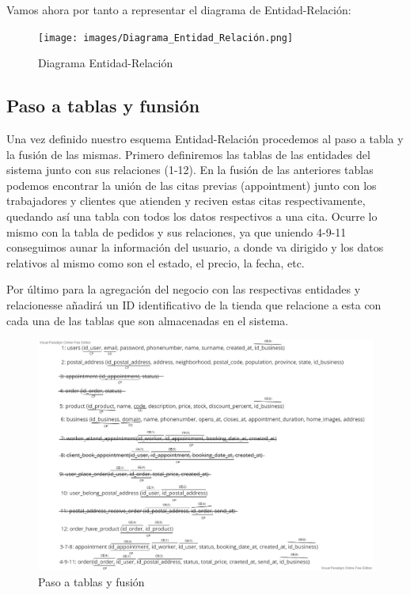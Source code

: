 Vamos ahora por tanto a representar el diagrama de Entidad-Relación: 

\begin{figure}[H]
  \centering
  \texttt{[image: images/Diagrama\_Entidad\_Relación.png]}
  \caption{Diagrama Entidad-Relación}
  \label{}
\end{figure}

\subsection{Paso a tablas y funsión}

Una vez definido nuestro esquema Entidad-Relación procedemos al paso a tabla y la fusión de las mismas. Primero definiremos las tablas de las entidades del sistema junto con sus relaciones (1-12). En la fusión de las anteriores tablas podemos encontrar la unión de las citas previas (appointment) junto con los trabajadores y clientes que atienden y reciven estas citas respectivamente, quedando así una tabla con todos los datos respectivos a una cita. Ocurre lo mismo con la tabla de pedidos y sus relaciones, ya que uniendo 4-9-11 conseguimos aunar la información del usuario, a donde va dirigido y los datos relativos al mismo como son el estado, el precio, la fecha, etc.


Por último para la agregación del negocio con las respectivas entidades y relacionesse añadirá un ID identificativo de la tienda que relacione a esta con cada una de las tablas que son almacenadas en el sistema.

\begin{figure}[H]
  \centering
  \includegraphics[scale=0.3]{images/Paso_a_Tablas_Negocio.png}
  \caption{Paso a tablas y fusión}
  \label{}
\end{figure}

